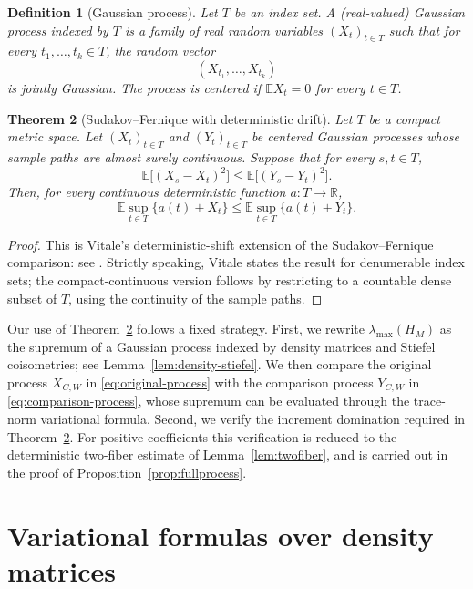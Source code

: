 \documentclass{article}
\newtheorem{theorem}{Theorem}[section]
\newtheorem{definition}[theorem]{Definition}
\newcommand{\E}{\mathbb E}
\begin{document}
\begin{definition}[Gaussian process]
	Let $T$ be an index set. A (real-valued) Gaussian process indexed by $T$ is a
	family of real random variables $(X_t)_{t\in T}$ such that for every
	$t_1,\ldots,t_k\in T$, the random vector
	\[
		(X_{t_1},\ldots,X_{t_k})
	\]
	is jointly Gaussian. The process is centered if $\E X_t=0$ for every
	$t\in T$.
\end{definition}

\begin{theorem}[Sudakov--Fernique with deterministic drift]
	\label{thm:sudakov-fernique-drift}
	Let $T$ be a compact metric space. Let $(X_t)_{t\in T}$ and
	$(Y_t)_{t\in T}$ be centered Gaussian processes whose sample paths are
	almost surely continuous. Suppose that for every $s,t\in T$,
	\[
		\E\bigl[(X_s-X_t)^2\bigr]
		\le
		\E\bigl[(Y_s-Y_t)^2\bigr].
	\]
	Then, for every continuous deterministic function $a:T\to\mathbb R$,
	\[
		\E \sup_{t\in T}\{a(t)+X_t\}
		\le
		\E \sup_{t\in T}\{a(t)+Y_t\}.
	\]
\end{theorem}
\begin{proof}
	This is Vitale's deterministic-shift extension of the
	Sudakov--Fernique comparison: see \cite[(4), Section 1]{Vitale}.
	Strictly speaking, Vitale states the result for denumerable index sets;
	the compact-continuous version follows by restricting to a countable
	dense subset of \(T\), using the continuity of the sample paths.
\end{proof}

Our use of Theorem~\ref{thm:sudakov-fernique-drift} follows a fixed strategy.
First, we rewrite $\lambda_{\max}(H_M)$ as the supremum of a Gaussian process
indexed by density matrices and Stiefel coisometries; see
Lemma~\ref{lem:density-stiefel}.  We then compare the original process
$X_{C,W}$ in \eqref{eq:original-process} with the comparison process
$Y_{C,W}$ in \eqref{eq:comparison-process}, whose supremum can be evaluated
through the trace-norm variational formula.
Second, we verify the increment domination required in
Theorem~\ref{thm:sudakov-fernique-drift}.  For positive coefficients this
verification is reduced to the deterministic two-fiber estimate of
Lemma~\ref{lem:twofiber}, and is carried out in the proof of
Proposition~\ref{prop:fullprocess}.



\section{Variational formulas over density matrices}
\label{sec:variational}
\end{document}
